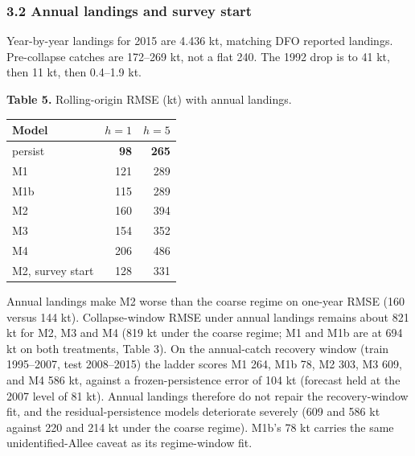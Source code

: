 \documentclass[11pt]{article}
\begin{document}
\subsubsection{3.2 Annual landings and survey
start}\label{annual-landings-and-survey-start}

Year-by-year landings for 2015 are 4.436 kt, matching DFO reported
landings. Pre-collapse catches are 172--269 kt, not a flat 240. The 1992
drop is to 41 kt, then 11 kt, then 0.4--1.9 kt.

\textbf{Table 5.} Rolling-origin RMSE (kt) with annual landings.

\begin{longtable}[]{@{}lrr@{}}
\toprule\noalign{}
Model & \(h=1\) & \(h=5\) \\
\midrule\noalign{}
\endhead
\bottomrule\noalign{}
\endlastfoot
persist & \textbf{98} & \textbf{265} \\
M1 & 121 & 289 \\
M1b & 115 & 289 \\
M2 & 160 & 394 \\
M3 & 154 & 352 \\
M4 & 206 & 486 \\
M2, survey start & 128 & 331 \\
\end{longtable}

Annual landings make M2 worse than the coarse regime on one-year RMSE
(160 versus 144 kt). Collapse-window RMSE under annual landings remains
about 821 kt for M2, M3 and M4 (819 kt under the coarse regime; M1 and
M1b are at 694 kt on both treatments, Table 3). On the annual-catch recovery window (train 1995--2007, test 2008--2015)
the ladder scores M1 264, M1b 78, M2 303, M3 609, and M4 586 kt, against
a frozen-persistence error of 104 kt (forecast held at the 2007 level of
81 kt). Annual landings therefore do not repair the recovery-window fit,
and the residual-persistence models deteriorate severely (609 and 586 kt
against 220 and 214 kt under the coarse regime). M1b's 78 kt carries the
same unidentified-Allee caveat as its regime-window fit.
\end{document}
